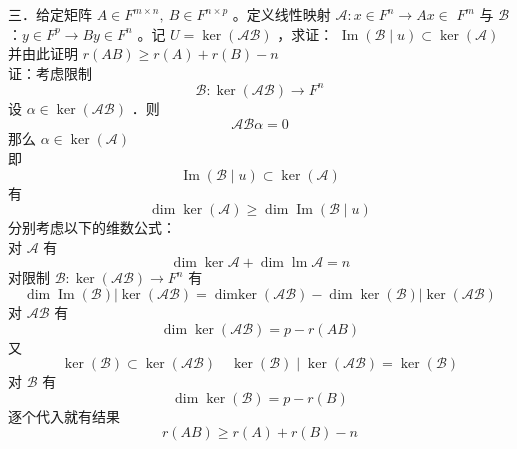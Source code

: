 \documentclass[UTF8]{ctexart}
\begin{document}
\noindent 三．给定矩阵 $A \in F^{m \times n}, ~ B \in F^{n \times p}$ 。定义线性映射 $\mathcal{A}: x \in F^{n} \rightarrow A x \in$ $F^{m}$ 与 $\mathcal{B}$ ：$y \in F^{p} \rightarrow B y \in F^{n}$ 。记 $U=\operatorname{ker}(\mathcal{A} \mathcal{B})$ ，求证： $\operatorname{Im}(\mathcal{B} \mid u) \subset \operatorname{ker}(\mathcal{A})$并由此证明 $r(A B) \geq r(A)+r(B)-n$\\
证：考虑限制 
$$\mathcal{B}: \operatorname{ker}(\mathcal{A} \mathcal{B}) \rightarrow F^{n}$$
设 $\alpha \in \operatorname{ker}(\mathcal{A} \mathcal{B})$ ．则 
$$\mathcal{A} \mathcal{B} \alpha=0$$
那么 $\alpha \in \operatorname{ker}(\mathcal{A})$\\
即 
$$\operatorname{Im}(\mathcal{B} \mid u) \subset \operatorname{ker}(\mathcal{A})$$
有 
$$\operatorname{dim} \operatorname{ker}(\mathcal{A}) \geq \operatorname{dim} \operatorname{Im}(\mathcal{B} \mid u)$$
分别考虑以下的维数公式：\\
对 $\mathcal{A}$ 有 
$$\operatorname{dim} \operatorname{ker} \mathcal{A}+\operatorname{dim} \operatorname{lm} \mathcal{A}=n$$
对限制 $\mathcal{B}: \operatorname{ker}(\mathcal{A} \mathcal{B}) \rightarrow F^{n}$ 有
$$\operatorname{dim} \operatorname{Im}(\mathcal{B})|\operatorname{ker}(\mathcal{A} \mathcal{B})=\operatorname{dimker}(\mathcal{A} \mathcal{B})-\operatorname{dim} \operatorname{ker}(\mathcal{B})| \operatorname{ker}(\mathcal{A} \mathcal{B})$$
对 $\mathcal{A B}$ 有 
$$\operatorname{dim} \operatorname{ker}(\mathcal{A B})=p-r(A B)$$
又 
$$\operatorname{ker}(\mathcal{B}) \subset \operatorname{ker}(\mathcal{A} \mathcal{B}) \quad \operatorname{ker}(\mathcal{B}) \mid \operatorname{ker}(\mathcal{A} \mathcal{B})=\operatorname{ker}(\mathcal{B})$$
对 $\mathcal{B}$ 有 
$$\operatorname{dim} \operatorname{ker}(\mathcal{B})=p-r(B)$$
逐个代入就有结果 
$$r(A B) \geq r(A)+r(B)-n$$\\
\end{document}
